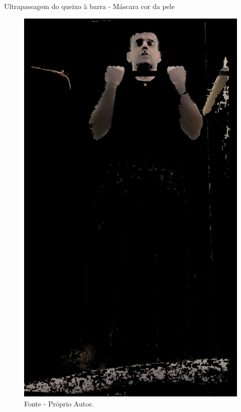 \begin{frame}{Ultrapassagem do queixo à barra - Máscara cor da pele}
    \begin{figure}[!ht]
        \centering
            \includegraphics[scale=0.1]{img/desenvolvimento/ultrapassagemBarra/skin.png}
        \caption*{Fonte - Próprio Autor.}
    \end{figure}
\end{frame}

